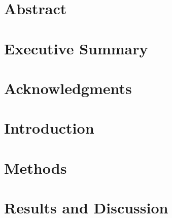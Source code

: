 \documentclass[12pt, oneside]{book}
\begin{document}
\chapter{Abstract}

\chapter{Executive Summary}


\chapter{Acknowledgments}


\tableofcontents

\listoffigures

\mainmatter

\chapter{Introduction}


\chapter{Methods}


\chapter{Results and Discussion}


\appendix 
\end{document}
